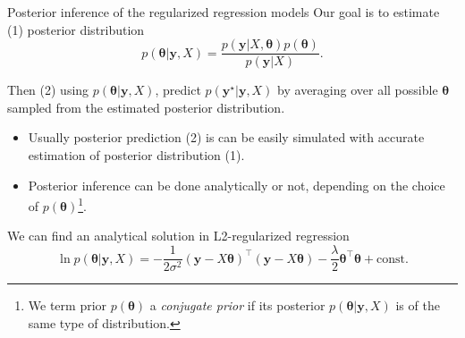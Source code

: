 \documentclass[
  ignorenonframetext,
  aspectratio=169]{beamer}
\begin{document}
\begin{frame}{Posterior inference of the regularized regression models}
\protect\hypertarget{posterior-inference-of-the-regularized-regression-models}{}
Our goal is to estimate (1) posterior distribution \[
p(\boldsymbol{\theta}|\mathbf{y}, X) = \frac{p(\mathbf{y}|X,\boldsymbol{\theta})p(\boldsymbol{\theta})}{p(\boldsymbol{y}|X)}.
\]

Then (2) using \(p(\boldsymbol{\theta}|\mathbf{y},X)\), predict
\(p(\mathbf{y}^{\star}|\mathbf{y},X)\) by averaging over all possible
\(\boldsymbol{\theta}\) sampled from the estimated posterior
distribution.

\vfill

\begin{itemize}
\item
  Usually posterior prediction (2) is can be easily simulated with
  accurate estimation of posterior distribution (1).
\item
  Posterior inference can be done analytically or not, depending on the
  choice of
  \(p(\boldsymbol{\theta})\)\footnote{We term prior $p(\boldsymbol{\theta})$ a {\it conjugate prior} if its posterior $p(\boldsymbol{\theta}|\mathbf{y},X)$ is of the same type of distribution.}.
\end{itemize}
\end{frame}

\begin{frame}{We can find an analytical solution in L2-regularized
regression}
\protect\hypertarget{we-can-find-an-analytical-solution-in-l2-regularized-regression}{}
\[
\ln p(\mathbf{\boldsymbol{\theta}}|\mathbf{y},X) =
-\frac{1}{2\sigma^{2}} (\mathbf{y} - X\boldsymbol{\theta})^{\top}(\mathbf{y} - X\boldsymbol{\theta}) - \frac{\lambda}{2} \boldsymbol{\theta}^{\top}\boldsymbol{\theta} + \textrm{const.}
\]


\vfill


\end{frame}
\end{document}
